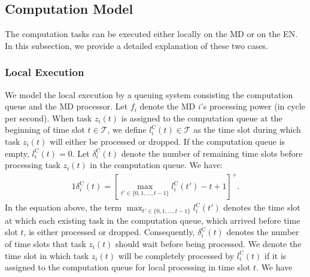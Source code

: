 \documentclass[10pt, journal,letterpaper]{IEEEtran}
\begin{document}
\subsection{Computation Model}
The computation tasks can be executed either locally on the MD or on the EN. In this subsection, we provide a detailed explanation of these two cases.
\subsubsection{Local Execution}
We model the local execution by a queuing system consisting the computation queue and the MD processor. Let $f_i$ denote the MD $i$'s processing power (in cycle per second). When task $z_i(t)$ is assigned to the computation queue at the beginning of time slot $t \in \mathcal{T}$, we define $l_i^{\text{C}}(t) \in \mathcal{T}$ as the time slot during which task $z_i(t)$ will either be processed or dropped. If the computation queue is empty, $l_i^{\text{C}}(t) = 0$. Let $\delta_i^{\text{C}}(t)$ denote the number of remaining time slots before processing task $z_i(t)$ in the computation queue. We have:
\begin{alignat}{1}
	\delta_i^{\text{C}}(t) = \left[ \max \limits_{t' \in \{0,1,\ldots,t-1\}} l_i^{\text{C}}(t')-t+1 \right]^+.
	\label{5}  
\end{alignat}
In the equation above, the term $\max_{t' \in \{0, 1, \ldots, t-1\}} l_i^{\text{C}}(t')$ denotes the time slot at which each existing task in the computation queue, which arrived before time slot $t$, is either processed or dropped. Consequently, $\delta_i^{\text{C}}(t)$ denotes the number of time slots that task $z_i(t)$ should wait before being processed. We denote the time slot in which task $z_i(t)$ will be completely processed by $l_i^{\text{C}}(t)$ if it is assigned to the computation queue for local processing in time slot $t$. We have
\end{document}
